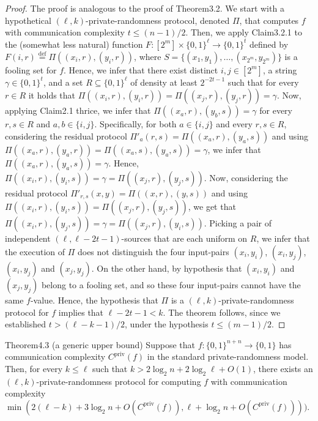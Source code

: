 \begin{proof}
The proof is analogous to the proof of Theorem3.2. We start with a hypothetical $(\ell,k)$-private-randomness protocol, denoted $\Pi$, that computes $f$ with communication complexity $t\le(n-1)/2$. Then, we apply Claim3.2.1 to the (somewhat less natural) function $F:[2^m]\times\{0,1\}^\ell\to\{0,1\}^t$ defined by $F(i,r)\stackrel{\mathrm{def}}=\Pi((x_i,r),(y_i,r))$, where $S=\{(x_1,y_1),\ldots,(x_{2^m},y_{2^m})\}$ is a fooling set for $f$. Hence, we infer that there exist distinct $i,j\in[2^m]$, a string $\gamma\in\{0,1\}^t$, and a set $R\subseteq\{0,1\}^\ell$ of density at least $2^{-2t-1}$ such that for every $r\in R$ it holds that $\Pi((x_i,r),(y_i,r))=\Pi((x_j,r),(y_j,r))=\gamma$.
Now, applying Claim2.1 thrice, we infer that $\Pi((x_a,r),(y_b,s))=\gamma$ for every $r,s\in R$ and $a,b\in\{i,j\}$. Specifically, for both $a\in\{i,j\}$ and every $r,s\in R$, considering the residual protocol $\Pi'_a(r,s)=\Pi((x_a,r),(y_a,s))$ and using $\Pi((x_a,r),(y_a,r))=\Pi((x_a,s),(y_a,s))=\gamma$, we infer that $\Pi((x_a,r),(y_a,s))=\gamma$. Hence, $\Pi((x_i,r),(y_i,s))=\gamma=\Pi((x_j,r),(y_j,s))$. Now, considering the residual protocol $\Pi'_{r,s}(x,y)=\Pi((x,r),(y,s))$ and using $\Pi((x_i,r),(y_i,s))=\Pi((x_j,r),(y_j,s))$, we get that $\Pi((x_i,r),(y_j,s))=\gamma=\Pi((x_j,r),(y_i,s))$.
Picking a pair of independent $(\ell,\ell-2t-1)$-sources that are each uniform on $R$, we infer that the execution of $\Pi$ does not distinguish the four input-pairs $(x_i,y_i)$, $(x_i,y_j)$, $(x_i,y_j)$ and $(x_j,y_j)$. On the other hand, by hypothesis that $(x_i,y_i)$ and $(x_j,y_j)$ belong to a fooling set, and so these four input-pairs cannot have the same $f$-value. Hence, the hypothesis that $\Pi$ is a $(\ell,k)$-private-randomness protocol for $f$ implies that $\ell-2t-1<k$. The theorem follows, since we established $t>(\ell-k-1)/2$, under the hypothesis $t\le(m-1)/2$.
\end{proof}
\begin{authorclaim}{Theorem4.3 (a generic upper bound)}
Suppose that $f:\{0,1\}^{n+n}\to\{0,1\}$ has communication complexity $C^{\mathrm{priv}}(f)$ in the standard private-randomness model. Then, for every $k\le\ell$ such that $k>2\log_2n+2\log_2\ell+O(1)$, there exists an $(\ell,k)$-private-randomness protocol for computing $f$ with communication complexity $\min(2(\ell-k)+3\log_2n+O(C^{\mathrm{priv}}(f)),\ell+\log_2n+O(C^{\mathrm{priv}}(f))))$.
\end{authorclaim}
